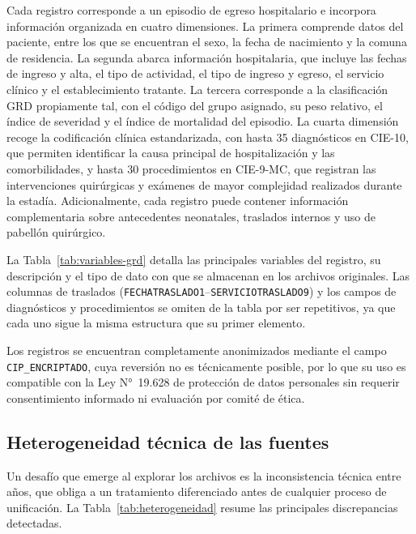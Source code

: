 Cada registro corresponde a un episodio de egreso hospitalario e incorpora
información organizada en cuatro dimensiones. La primera comprende datos del
paciente, entre los que se encuentran el sexo, la fecha de nacimiento y la
comuna de residencia. La segunda abarca información hospitalaria, que incluye
las fechas de ingreso y alta, el tipo de actividad, el tipo de ingreso y egreso,
el servicio clínico y el establecimiento tratante. La tercera corresponde a la
clasificación GRD propiamente tal, con el código del grupo asignado, su peso
relativo, el índice de severidad y el índice de mortalidad del episodio. La
cuarta dimensión recoge la codificación clínica estandarizada, con hasta 35
diagnósticos en CIE-10, que permiten identificar la causa principal de
hospitalización y las comorbilidades, y hasta 30 procedimientos en CIE-9-MC,
que registran las intervenciones quirúrgicas y exámenes de mayor complejidad
realizados durante la estadía. Adicionalmente, cada registro puede contener
información complementaria sobre antecedentes neonatales, traslados internos y
uso de pabellón quirúrgico.

La Tabla~\ref{tab:variables-grd} detalla las principales variables del registro,
su descripción y el tipo de dato con que se almacenan en los archivos originales.
Las columnas de traslados (\texttt{FECHATRASLADO1}--\texttt{SERVICIOTRASLADO9})
y los campos de diagnósticos y procedimientos se omiten de la tabla por ser
repetitivos, ya que cada uno sigue la misma estructura que su primer elemento.

Los registros se encuentran completamente anonimizados mediante el campo
\texttt{CIP\_ENCRIPTADO}, cuya reversión no es técnicamente posible, por lo que
su uso es compatible con la Ley N°~19.628 de protección de datos personales sin
requerir consentimiento informado ni evaluación por comité de ética.

\subsection{Heterogeneidad técnica de las fuentes}
\label{sec:heterogeneidad}

Un desafío que emerge al explorar los archivos es la inconsistencia técnica entre
años, que obliga a un tratamiento diferenciado antes de cualquier proceso de
unificación. La Tabla~\ref{tab:heterogeneidad} resume las principales
discrepancias detectadas.

